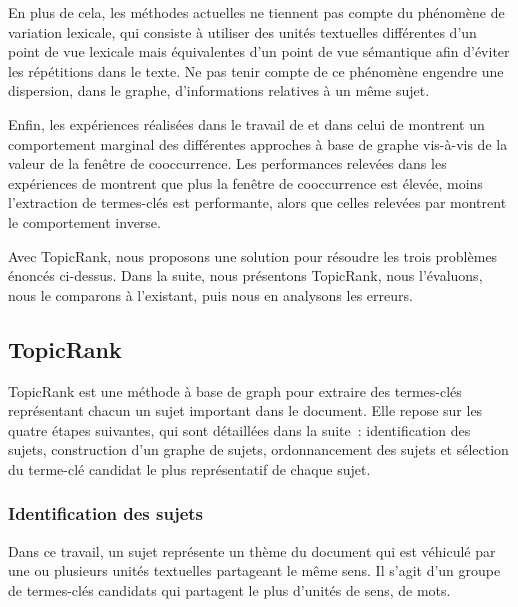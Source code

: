     En plus de cela, les méthodes actuelles ne tiennent pas compte du phénomène
    de variation lexicale, qui consiste à utiliser des unités textuelles
    différentes d'un point de vue lexicale mais équivalentes d'un point de vue
    sémantique afin d'éviter les répétitions dans le texte. Ne pas tenir compte
    de ce phénomène engendre une dispersion, dans le graphe, d'informations
    relatives à un même sujet.
    
    Enfin, les expériences réalisées dans le travail de
     et dans celui de 
    montrent un comportement marginal des différentes approches à base de graphe
    vis-à-vis de la valeur de la fenêtre de cooccurrence. Les performances
    relevées dans les expériences de  montrent que
    plus la fenêtre de cooccurrence est élevée, moins l'extraction de
    termes-clés est performante, alors que celles relevées par
     montrent le comportement inverse. 

    Avec TopicRank, nous proposons une solution pour résoudre les trois
    problèmes énoncés ci-dessus. Dans la suite, nous présentons TopicRank, nous
    l'évaluons, nous le comparons à l'existant, puis nous en analysons les
    erreurs.

    \subsection{TopicRank}
    \label{subsec:main:domain_independent_keyphrase_extraction-unsupervised_automatic_keyphrase_extraction-topicrank}
      TopicRank est une méthode à base de graph pour extraire des termes-clés
      représentant chacun un sujet important dans le document.
      Elle repose sur les quatre étapes suivantes, qui sont détaillées dans
      la suite~: identification des sujets, construction d'un graphe de sujets,
      ordonnancement des sujets et sélection du terme-clé candidat le plus
      représentatif de chaque sujet.

      \subsubsection{Identification des sujets}
      \label{subsubsec:main:domain_independent_keyphrase_extraction-unsupervised_automatic_keyphrase_extraction-topicrank-topic_identification}
        Dans ce travail, un sujet représente un thème du document qui est
        véhiculé par une ou plusieurs unités textuelles partageant le même
        sens. Il s'agit d'un groupe de termes-clés candidats qui partagent le
        plus d'unités de sens, de mots.

